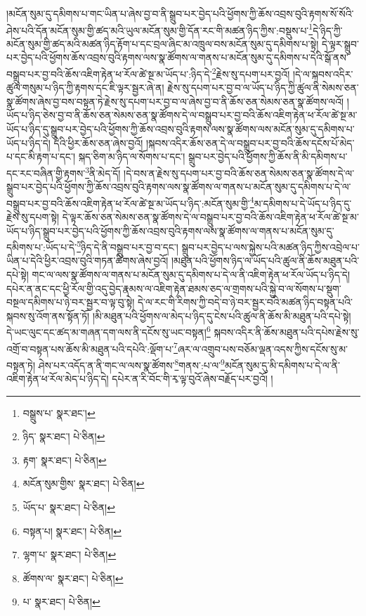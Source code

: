 །མངོན་སུམ་དུ་དམིགས་པ་གང་ཡིན་པ་ཞེས་བྱ་བ་ནི་སྒྲུབ་པར་བྱེད་པའི་ཕྱོགས་ཀྱི་ཆོས་འབྲས་བུའི་རྟགས་སོ་སོའི་ཤེས་པའི་དོན་མངོན་སུམ་གྱི་ཚད་མའི་ཡུལ་མངོན་སུམ་གྱི་དོན་རང་གི་མཚན་ཉིད་ཀྱིས་:བསྡུས་པ་\footnote{བསྒྲུས་པ་  སྣར་ཐང་། }དེ་ཉིད་ཀྱི་མངོན་སུམ་གྱི་ཚད་མའི་མཚན་ཉིད་རྟོག་པ་དང་བྲལ་ཞིང་མ་འཁྲུལ་བས་མངོན་སུམ་དུ་དམིགས་པ་སྟེ། དེ་ལྟར་སྒྲུབ་པར་བྱེད་པའི་ཕྱོགས་ཆོས་འབྲས་བུའི་རྟགས་ལས་སྣ་ཚོགས་ལ་གནས་པ་མངོན་སུམ་དུ་དམིགས་པ་དེའི་སྒོ་ནས་བསྒྲུབ་པར་བྱ་བའི་ཆོས་འཇིག་རྟེན་ཕ་རོལ་ཚེ་སྔ་མ་ཡོད་པ་:ཉིད་དེ་\footnote{ཉིད་  སྣར་ཐང་།  པེ་ཅིན། }རྗེས་སུ་དཔག་པར་བྱའོ། །དེ་ལ་སྐབས་འདིར་ཚུལ་གསུམ་པ་ཉིད་ཀྱི་རྟགས་དང་ཇི་ལྟར་སྦྱར་ཞེ་ན། རྗེས་སུ་དཔག་པར་བྱ་བ་ལ་ཡོད་པ་ཉིད་ཀྱི་ཚུལ་ནི་སེམས་ཅན་སྣ་ཚོགས་ཞེས་བྱ་བས་བསྟན་ཏེ་རྗེས་སུ་དཔག་པར་བྱ་བ་ལ་ཞེས་བྱ་བ་ནི་ཆོས་ཅན་སེམས་ཅན་སྣ་ཚོགས་ལའོ། །ཡོད་པ་ཉིད་ཅེས་བྱ་བ་ནི་ཆོས་ཅན་སེམས་ཅན་སྣ་ཚོགས་དེ་ལ་བསྒྲུབ་པར་བྱ་བའི་ཆོས་འཇིག་རྟེན་ཕ་རོལ་ཚེ་སྔ་མ་ཡོད་པ་ཉིད་དུ་སྒྲུབ་པར་བྱེད་པའི་ཕྱོགས་ཀྱི་ཆོས་འབྲས་བུའི་རྟགས་ལས་སྣ་ཚོགས་ལས་མངོན་སུམ་དུ་དམིགས་པ་ཡོད་པ་ཉིད་དེ། དེའི་ཕྱིར་ཆོས་ཅན་ཞེས་བྱའོ། །སྐབས་འདིར་ཆོས་ཅན་དེ་ལ་བསྒྲུབ་པར་བྱ་བའི་ཆོས་དངོས་པོ་མེད་པ་དང་མི་རྟག་པ་དང་། སྐད་ཅིག་མ་ཉིད་ལ་སོགས་པ་དང་། སྒྲུབ་པར་བྱེད་པའི་ཕྱོགས་ཀྱི་ཆོས་ནི་མི་དམིགས་པ་དང་རང་བཞིན་གྱི་རྟགས་\footnote{རྟག་  སྣར་ཐང་།  པེ་ཅིན། }ནི་མེད་དོ། །དེ་བས་ན་རྗེས་སུ་དཔག་པར་བྱ་བའི་ཆོས་ཅན་སེམས་ཅན་སྣ་ཚོགས་དེ་ལ་སྒྲུབ་པར་བྱེད་པའི་ཕྱོགས་ཀྱི་ཆོས་འབྲས་བུའི་རྟགས་ལས་སྣ་ཚོགས་ལ་གནས་པ་མངོན་སུམ་དུ་དམིགས་པ་དེ་ལ་བསྒྲུབ་པར་བྱ་བའི་ཆོས་འཇིག་རྟེན་ཕ་རོལ་ཚེ་སྔ་མ་ཡོད་པ་ཉིད་:མངོན་སུམ་གྱི་\footnote{མངོན་སུམ་གྱིས་  སྣར་ཐང་།  པེ་ཅིན། }མ་དམིགས་པ་དེ་ཡོད་པ་ཉིད་དུ་རྗེས་སུ་དཔག་སྟེ། དེ་ལྟར་ཆོས་ཅན་སེམས་ཅན་སྣ་ཚོགས་དེ་ལ་བསྒྲུབ་པར་བྱ་བའི་ཆོས་འཇིག་རྟེན་ཕ་རོལ་ཚེ་སྔ་མ་ཡོད་པ་ཉིད་སྒྲུབ་པར་བྱེད་པའི་ཕྱོགས་ཀྱི་ཆོས་འབྲས་བུའི་རྟགས་ལས་སྣ་ཚོགས་ལ་གནས་པ་མངོན་སུམ་དུ་དམིགས་པ་:ཡོད་པ་དེ་\footnote{ཡོད་པ་  སྣར་ཐང་།  པེ་ཅིན། }ཉིད་དེ་ནི་བསྒྲུབ་པར་བྱ་བ་དང་། སྒྲུབ་པར་བྱེད་པ་ལས་སྐྱེས་པའི་མཚན་ཉིད་ཀྱིས་འབྲེལ་པ་ཡིན་པ་དེའི་ཕྱིར་འབྲས་བུའི་གཏན་ཚིགས་ཞེས་བྱའོ། །མཐུན་པའི་ཕྱོགས་ཉིད་ལ་ཡོད་པའི་ཚུལ་ནི་ཆོས་མཐུན་པའི་དཔེ་སྟེ། གང་ལ་ལས་སྣ་ཚོགས་ལ་གནས་པ་མངོན་སུམ་དུ་དམིགས་པ་དེ་ལ་ནི་འཇིག་རྟེན་ཕ་རོལ་ཡོད་པ་ཉིད་དེ། དཔེར་ན་ནང་དང་ཕྱི་རོལ་གྱི་འདུ་བྱེད་རྣམས་ལ་འཇིག་རྟེན་ཐམས་ཅད་ལ་གྲགས་པའི་སྐྱེ་བ་ལ་སོགས་པ་སྡུག་བསྔལ་དམིགས་པ་ཉེ་བར་སྦྱར་བ་ལྟ་བུ་སྟེ། དེ་ལ་རང་གི་རིགས་ཀྱི་བདེ་བ་ཉེ་བར་སྦྱར་བའི་མཚན་ཉིད་བསྟན་པའི་སྐབས་སུ་འོག་ནས་སྟོན་ཏོ། །མི་མཐུན་པའི་ཕྱོགས་ལ་མེད་པ་ཉིད་དུ་ངེས་པའི་ཚུལ་ནི་ཆོས་མི་མཐུན་པའི་དཔེ་སྟེ། དེ་ཡང་ལུང་དང་ཚད་མ་གཞན་དག་ལས་ནི་དངོས་སུ་ཡང་བསྟན།\footnote{བསྟན་པ།  སྣར་ཐང་།  པེ་ཅིན། } སྐབས་འདིར་ནི་ཆོས་མཐུན་པའི་དཔེས་རྗེས་སུ་འགྲོ་བ་བསྟན་པས་ཆོས་མི་མཐུན་པའི་དཔེའི་:ལྡོག་པ་\footnote{ལྷག་པ་  སྣར་ཐང་།  པེ་ཅིན། }ཞར་ལ་འགྲུབ་པས་བཅོམ་ལྡན་འདས་ཀྱིས་དངོས་སུ་མ་བསྟན་ཏེ། ཤེས་པར་འདོད་ན་ནི་གང་ལ་ལས་སྣ་ཚོགས་\footnote{ཚོགས་ལ་  སྣར་ཐང་།  པེ་ཅིན། }གནས་:པ་ལ་\footnote{པ་  སྣར་ཐང་།  པེ་ཅིན། }མངོན་སུམ་དུ་མི་དམིགས་པ་དེ་ལ་ནི་འཇིག་རྟེན་ཕ་རོལ་མེད་པ་ཉིད་དེ། དཔེར་ན་རི་བོང་གི་རྭ་ལྟ་བུའོ་ཞེས་བརྗོད་པར་བྱའོ། །
